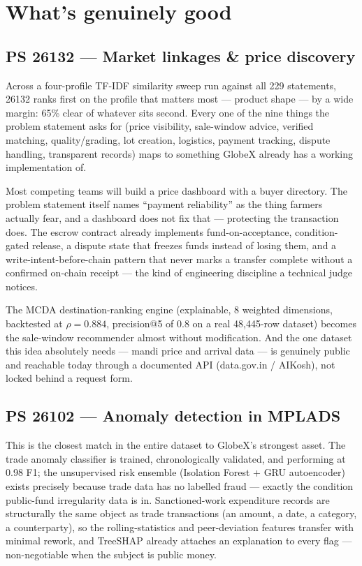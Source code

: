 \documentclass[11pt]{article}
\begin{document}
\clearpage
\section{What's genuinely good}

\subsection*{PS 26132 --- Market linkages \& price discovery}
Across a four-profile TF-IDF similarity sweep run against all 229 statements, 26132 ranks first on the
profile that matters most --- product shape --- by a wide margin: 65\% clear of whatever sits second. Every
one of the nine things the problem statement asks for (price visibility, sale-window advice, verified
matching, quality/grading, lot creation, logistics, payment tracking, dispute handling, transparent
records) maps to something GlobeX already has a working implementation of.

Most competing teams will build a price dashboard with a buyer directory. The problem statement itself
names ``payment reliability'' as the thing farmers actually fear, and a dashboard does not fix that ---
protecting the transaction does. The escrow contract already implements fund-on-acceptance, condition-gated
release, a dispute state that freezes funds instead of losing them, and a write-intent-before-chain pattern
that never marks a transfer complete without a confirmed on-chain receipt --- the kind of engineering
discipline a technical judge notices.

The MCDA destination-ranking engine (explainable, 8 weighted dimensions, backtested at $\rho = 0.884$,
precision@5 of 0.8 on a real 48{,}445-row dataset) becomes the sale-window recommender almost without
modification. And the one dataset this idea absolutely needs --- mandi price and arrival data --- is
genuinely public and reachable today through a documented API (data.gov.in / AIKosh), not locked behind a
request form.

\subsection*{PS 26102 --- Anomaly detection in MPLADS}
This is the closest match in the entire dataset to GlobeX's strongest asset. The trade anomaly classifier
is trained, chronologically validated, and performing at 0.98 F1; the unsupervised risk ensemble (Isolation
Forest + GRU autoencoder) exists precisely because trade data has no labelled fraud --- exactly the
condition public-fund irregularity data is in. Sanctioned-work expenditure records are structurally the
same object as trade transactions (an amount, a date, a category, a counterparty), so the rolling-statistics
and peer-deviation features transfer with minimal rework, and TreeSHAP already attaches an explanation to
every flag --- non-negotiable when the subject is public money.
\end{document}
